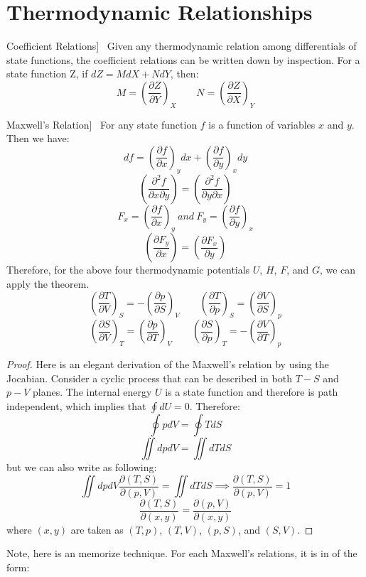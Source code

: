\documentclass[UTF8]{book}
\newenvironment{theorem}[2][Theorem]{\begin{trivlist}
\item[\hskip \labelsep {\bfseries #1}\hskip \labelsep {\bfseries }]}{\end{trivlist}}
\begin{document}
\section{Thermodynamic Relationships}
\begin{theorem}
[Coefficient Relations]~  {Given any thermodynamic relation among differentials of state functions, the coefficient relations can be written down by inspection. For a state function Z, if $dZ=MdX+NdY$, then:}
$$M=\left( \frac{\partial Z}{\partial Y}\right)_{X}\qquad N=\left( \frac{\partial Z}{\partial X}\right)_{Y}$$
\end{theorem}
\begin{theorem}
[Maxwell's Relation]~  {For any state function $f$ is a function of variables $x$ and $y$. Then we have:}
$$df=\left(\dfrac{\partial f}{\partial x}\right)_ydx+\left(\dfrac{\partial f}{\partial y}\right)_xdy$$
$$\left(\dfrac{\partial ^2 f}{\partial x\partial y }\right)=\left(\dfrac{\partial ^2 f}{\partial y\partial x }\right)$$
$$F_x=\left(\dfrac{\partial f}{\partial x}\right)_y \ and \ F_y=\left(\dfrac{\partial f}{\partial y}\right)_x$$
$$\left(\dfrac{\partial F_y}{\partial x}\right)=\left(\dfrac{\partial F_x}{\partial y}\right)$$
 {Therefore, for the above four thermodynamic potentials $U$, $H$, $F$, and $G$, we can apply the theorem.}
$$\left(\dfrac{\partial T}{\partial V}\right)_S=-\left(\dfrac{\partial p}{\partial S}\right)_V \qquad \left(\dfrac{\partial T}{\partial p}\right)_S=\left(\dfrac{\partial V}{\partial S}\right)_p$$
$$\left(\dfrac{\partial S}{\partial V}\right)_T=\left(\dfrac{\partial p}{\partial T}\right)_V \qquad \left(\dfrac{\partial S}{\partial p}\right)_T=-\left(\dfrac{\partial V}{\partial T}\right)_p$$
\end{theorem}
\begin{proof}
 {Here is an elegant derivation of the Maxwell's relation by using the Jocabian. Consider a cyclic process that can be described in both $T-S$ and $p-V$ planes. The internal energy $U$ is a state function and therefore is path independent, which implies that $\oint dU=0$. Therefore:}
$$\oint pdV=\oint TdS$$
$$\iint dpdV=\iint dTdS$$
 {but we can also write as following:}
$$\iint dpdV\dfrac{\partial (T,S)}{\partial (p,V)}=\iint dTdS \implies \dfrac{\partial (T,S)}{\partial (p,V)}=1$$
$$\dfrac{\partial (T,S)}{\partial (x,y)}=\dfrac{\partial (p,V)}{\partial (x,y)}$$
 {where $(x,y)$ are taken as $(T,p)$, $(T,V)$, $(p,S)$, and $(S,V)$.}
\end{proof}
 {Note, here is an memorize technique. For each Maxwell's relations, it is in of the form:}
\end{document}
